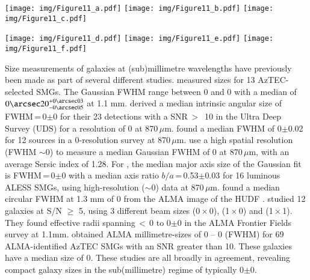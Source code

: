 \documentclass[longauth]{aa}
\begin{document}
\begin{figure*}[h!]
\centering
\begin{minipage}[t]{1.\textwidth}
\resizebox{\hsize}{!} { 
\texttt{[image: img/Figure11\_a.pdf]} 
\texttt{[image: img/Figure11\_b.pdf]} 
\texttt{[image: img/Figure11\_c.pdf]}
}
\end{minipage}
\begin{minipage}[t]{1.\textwidth}
\resizebox{\hsize}{!} { 
\texttt{[image: img/Figure11\_d.pdf]} 
\texttt{[image: img/Figure11\_e.pdf]} 
\texttt{[image: img/Figure11\_f.pdf]}
}
\end{minipage}
      \caption{10\arcsec\,$\times$\,10\arcsec postage stamps, centred on the galaxy detections. Left to right: the source in the 0-mosaic map, and the residuals obtained after PSF, Gaussian and Sersic flux fitting. The residuals are very similar between the three different extraction methods. Only the 6 brightest galaxies are shown.}
         \label{residuals}
\end{figure*}
Size measurements of galaxies at (sub)millimetre wavelengths have previously been made as part of several different studies. \cite{Ikarashi2015} measured sizes for 13 AzTEC-selected SMGs. The Gaussian FWHM range between 0 and 0 with a median of $0\arcsec20^{+0\arcsec03}_{-0\arcsec05}$ at 1.1 mm. \cite{Simpson2015b} derived a median intrinsic angular size of FWHM\,=\,0$\pm$0 for their 23 detections with a SNR\,$>$\, 10 in the Ultra Deep Survey (UDS) for a resolution of 0 at 870\,$\mu$m. \mbox{\cite{Tadaki2017}} found a median FWHM of 0$\pm$0.02 for 12 sources in a 0-resolution survey at 870\,$\mu$m. \cite{Barro2016} use a high spatial resolution (FWHM $\sim$0) to measure a median Gaussian FWHM of 0 at 870\,$\mu$m, with an average Sersic index of 1.28. For \cite{Hodge2016}, the median major axis size of the Gaussian fit is FWHM\,=\,0$\pm$0 with a median axis ratio $b/a$\,=\,0.53$\pm$0.03 for 16 luminous ALESS SMGs, using high-resolution ($\sim$0) data at 870\,$\mu$m. \cite{Rujopakarn2016} found a median circular FWHM at 1.3 mm of 0 from the ALMA image of the HUDF \citep{Dunlop2017}. \cite{Gonzalez-Lopez2017} studied 12 galaxies at S/N $\ge$ 5,  using 3 different beam sizes (0\,$\times$\,0), (1\,$\times$\,0) and (1\,$\times$\,1). They found effective radii spanning\,$<$\,0 to 0$\pm$0 in the ALMA Frontier Fields survey at 1.1mm. \cite{Ikarashi2017} obtained ALMA millimetre-sizes of 0 -- 0 (FWHM) for 69 ALMA-identified AzTEC SMGs with an SNR greater than 10. These galaxies have a median size of 0. These studies are all broadly in agreement, revealing compact galaxy sizes in the sub(millimetre) regime of typically 0$\pm$0.
\end{document}
